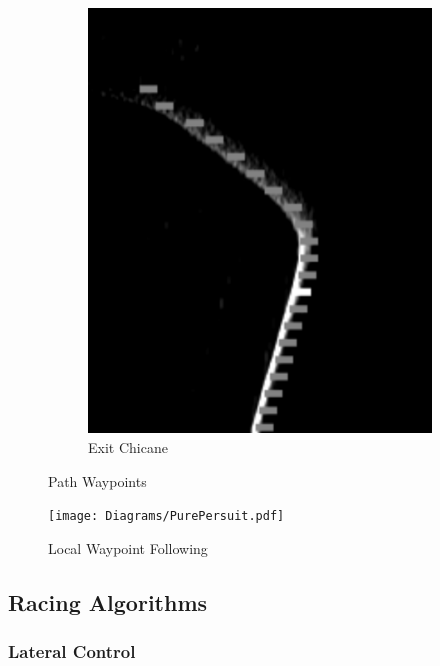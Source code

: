 \begin{figure}[H]
\begin{subfigure}[b]{0.32\textwidth}
                 \includegraphics[width=\textwidth,height=0.2\textheight]{visionpipeline/apprachLeft.png}
                 \caption{Exit Chicane}
                 \label{fig:exitChicane}
              \end{subfigure}
              \caption{Path Waypoints}
              \label{fig:PathWayPoints}
           \end{figure}


        \begin{figure}[H]
            \centering
            \texttt{[image: Diagrams/PurePersuit.pdf]}
            \caption{Local Waypoint Following}
            \label{fig:PurePersuit}
        \end{figure}

        
        \pagebreak{}
        \subsection{Racing Algorithms}
            \subsubsection{Lateral Control}

